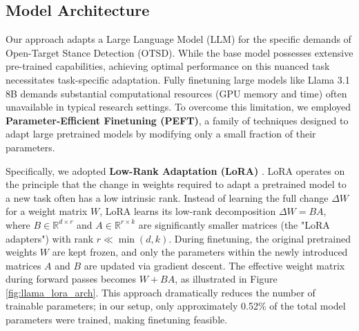 \documentclass[twocolumn,11pt,letterpaper]{article}
\begin{document}
\subsection{Model Architecture}
\label{sec:model_arch}

Our approach adapts a Large Language Model (LLM) for the specific demands of Open-Target Stance Detection (OTSD). While the base model possesses extensive pre-trained capabilities, achieving optimal performance on this nuanced task necessitates task-specific adaptation. Fully finetuning large models like Llama 3.1 8B demands substantial computational resources (GPU memory and time) often unavailable in typical research settings. To overcome this limitation, we employed \textbf{Parameter-Efficient Finetuning (PEFT)}, a family of techniques designed to adapt large pretrained models by modifying only a small fraction of their parameters.

Specifically, we adopted \textbf{Low-Rank Adaptation (LoRA)} \cite{lora}. LoRA operates on the principle that the change in weights required to adapt a pretrained model to a new task often has a low intrinsic rank. Instead of learning the full change $\Delta W$ for a weight matrix $W$, LoRA learns its low-rank decomposition $\Delta W = BA$, where $B \in \mathbb{R}^{d \times r}$ and $A \in \mathbb{R}^{r \times k}$ are significantly smaller matrices (the "LoRA adapters") with rank $r \ll \min(d, k)$. During finetuning, the original pretrained weights $W$ are kept frozen, and only the parameters within the newly introduced matrices $A$ and $B$ are updated via gradient descent. The effective weight matrix during forward passes becomes $W + BA$, as illustrated in Figure \ref{fig:llama_lora_arch}. This approach dramatically reduces the number of trainable parameters; in our setup, only approximately 0.52\% of the total model parameters were trained, making finetuning feasible.
\end{document}
